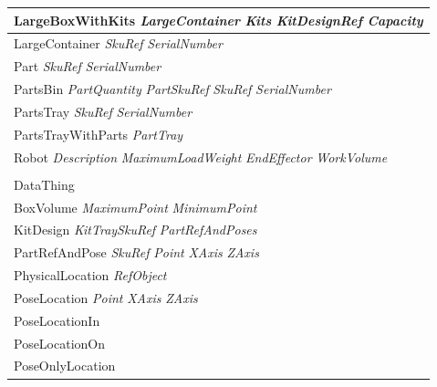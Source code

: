 \documentclass[final,1p,times]{elsarticle}
\newcommand{\class}[1] {\textsf{#1}}
\begin{document}
\begin{table}[!h!t]
{\begin{tabular}{l}
\\\midrule
\hspace{5 mm}\class{LargeBoxWithKits} \textit{LargeContainer} \textit{Kits} \textit{KitDesignRef} \textit{Capacity}
\\\midrule
\hspace{5 mm}\class{LargeContainer} \textit{SkuRef} \textit{SerialNumber}
\\\midrule
\hspace{5 mm}\class{Part} \textit{SkuRef} \textit{SerialNumber}
\\\midrule
\hspace{5 mm}\class{PartsBin} \textit{PartQuantity} \textit{PartSkuRef} \textit{SkuRef} \textit{SerialNumber}
\\\midrule
\hspace{5 mm}\class{PartsTray} \textit{SkuRef} \textit{SerialNumber}
\\\midrule
\hspace{5 mm}\class{PartsTrayWithParts} \textit{PartTray}
\\\midrule
\hspace{5 mm}\class{Robot} \textit{Description} \textit{MaximumLoadWeight} \textit{EndEffector} \textit{WorkVolume}
\\\midrule
\hspace{5 mm}
\\\midrule
\class{DataThing}
\\\midrule
\hspace{5 mm}\class{BoxVolume} \textit{MaximumPoint} \textit{MinimumPoint}
\\\midrule
\hspace{5 mm}\class{KitDesign} \textit{KitTraySkuRef} \textit{PartRefAndPoses}
\\\midrule
\hspace{5 mm}\class{PartRefAndPose} \textit{SkuRef} \textit{Point} \textit{XAxis} \textit{ZAxis}
\\\midrule
\hspace{5 mm}\class{PhysicalLocation} \textit{RefObject}
\\\midrule
\hspace{10 mm}\class{PoseLocation} \textit{Point} \textit{XAxis} \textit{ZAxis}
\\\midrule
\hspace{15 mm}\class{PoseLocationIn}
\\\midrule
\hspace{15 mm}\class{PoseLocationOn}
\\\midrule
\hspace{15 mm}\class{PoseOnlyLocation}

\end{tabular}}
\end{table}
\end{document}
